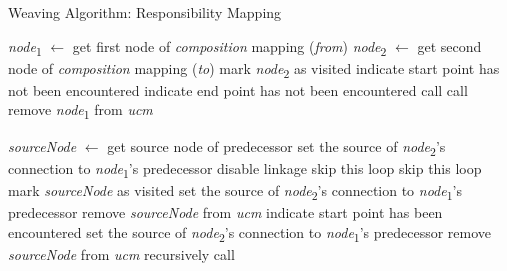 \begin{algorithm}
    \caption{Weaving Algorithm: Responsibility Mapping}
    \label{alg:1}
	\begin{algorithmic}[1]
			\State \emph{node}\textsubscript{1} $\gets$ get first node of \emph{composition} mapping (\emph{from})
			\State \emph{node}\textsubscript{2} $\gets$ get second node of \emph{composition} mapping (\emph{to})
			\State mark \emph{node}\textsubscript{2} as visited
			\State indicate start point has not been encountered
			\State indicate end point has not been encountered
			\State call 
			\State call 
			\State remove \emph{node}\textsubscript{1} from \emph{ucm}
		\EndFunction
		
				\State \emph{sourceNode} $\gets$ get source node of predecessor
				 \label{alg:1.1}
					\State set the source of \emph{node}\textsubscript{2}'s connection to \emph{node}\textsubscript{1}'s predecessor
					\State disable linkage
					\State skip this loop
				\EndIf \label{alg:1.2}
				 \label{alg:1.3}
					\State skip this loop
					\State mark \emph{sourceNode} as visited
				\EndIf \label{alg:1.4}
				 \label{alg:1.5}
						\State set the source of \emph{node}\textsubscript{2}'s connection to \emph{node}\textsubscript{1}'s predecessor
						\State remove \emph{sourceNode} from \emph{ucm}
						\State indicate start point has been encountered
					\EndIf \label{alg:1.6}
				 \label{alg:1.7}
					\State set the source of \emph{node}\textsubscript{2}'s connection to \emph{node}\textsubscript{1}'s predecessor
						\State remove \emph{sourceNode} from \emph{ucm}
					\EndIf \label{alg:1.8}
				\Else
					\State recursively call  \label{alg:1.9}
				\EndIf
			\EndFor
		\EndFunction
		
	\end{algorithmic}
\end{algorithm}

